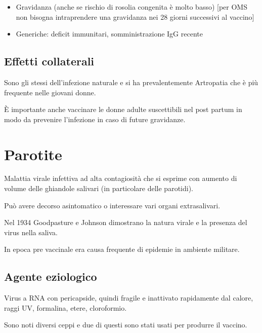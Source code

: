 \begin{itemize}
\item
  Gravidanza (anche se rischio di rosolia congenita è molto basso)
  {[}per OMS non bisogna intraprendere una gravidanza nei 28 giorni
  successivi al vaccino{]}
\item
  Generiche: deficit immunitari, somministrazione IgG recente
\end{itemize}

\subsection{Effetti collaterali}

Sono gli stessi dell'infezione naturale e si ha prevalentemente
Artropatia che è più frequente nelle giovani donne.

È importante anche vaccinare le donne adulte suscettibili nel post
partum in modo da prevenire l'infezione in caso di future gravidanze.


\section{Parotite}
Malattia virale infettiva ad alta contagiosità che si esprime con
aumento di volume delle ghiandole salivari (in particolare delle
parotidi).

Può avere decorso asintomatico o interessare vari organi extrasalivari.

Nel 1934 Goodpasture e Johnson dimostrano la natura virale e la presenza
del virus nella saliva.

In epoca pre vaccinale era causa frequente di epidemie in ambiente
militare.

\subsection{Agente eziologico}

Virus a RNA con pericapside, quindi fragile e inattivato rapidamente dal
calore, raggi UV, formalina, etere, cloroformio.

Sono noti diversi ceppi e due di questi sono stati usati per produrre il
vaccino.

